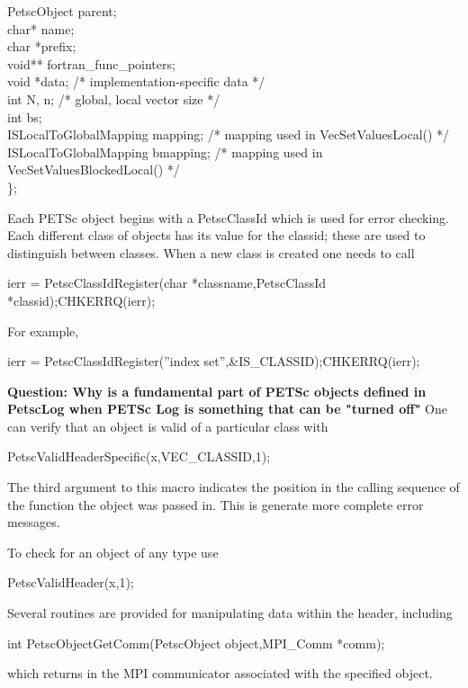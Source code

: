 \documentclass[twoside,12pt]{../sty/report_petsc}
\begin{document}
\begin{tabbing}
  PetscObject            parent;                                  \\
  char*                  name;                                    \\
  char                   *prefix;                                 \\
  void**                 fortran\_func\_pointers;       \\
  void                   *data;     /* implementation-specific data */\\
  int                    N, n;      /* global, local vector size */\\
  int                    bs;\\
  ISLocalToGlobalMapping mapping;   /* mapping used in VecSetValuesLocal() */\\
  ISLocalToGlobalMapping bmapping;  /* mapping used in VecSetValuesBlockedLocal() */\\
\};
\end{tabbing}

Each PETSc object begins with a PetscClassId which is used for error checking.
Each different class of objects has its value for the classid; these are used
to distinguish between classes. When a new class is created one needs to call
\begin{tabbing}
  ierr = PetscClassIdRegister(char *classname,PetscClassId *classid);CHKERRQ(ierr);
\end{tabbing}
For example,
\begin{tabbing}
  ierr = PetscClassIdRegister(''index set'',\&IS\_CLASSID);CHKERRQ(ierr);
\end{tabbing}
{\bf Question: Why is a fundamental part of PETSc objects defined in PetscLog when PETSc Log
is something that can be "turned off"} One can verify that an object is valid of a particular
class with 
\begin{tabbing}
  PetscValidHeaderSpecific(x,VEC\_CLASSID,1);
\end{tabbing}
The third argument to this macro indicates the position in the calling sequence of the 
function the object was passed in. This is generate more complete error messages.

To check for an object of any type use
\begin{tabbing}
  PetscValidHeader(x,1);
\end{tabbing}


Several routines are provided for manipulating data within the header,
including
\begin{tabbing}
   int PetscObjectGetComm(PetscObject object,MPI\_Comm *comm);
\end{tabbing}
which returns in   the MPI communicator associated with the
specified object.
\end{document}
